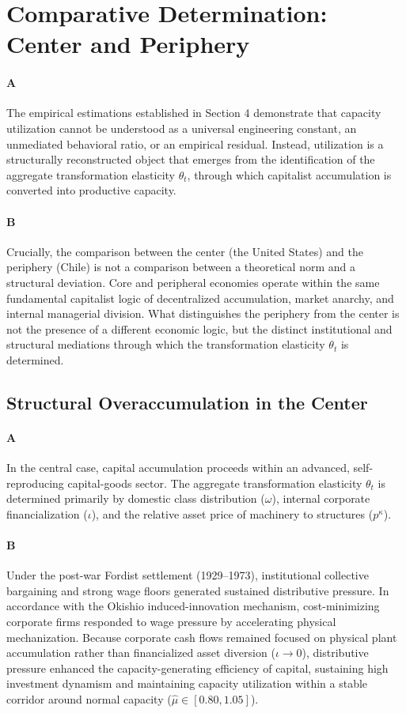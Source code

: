 \section{Comparative Determination: Center and Periphery}

\paragraph{A}
The empirical estimations established in Section 4 demonstrate that capacity utilization cannot be understood as a universal engineering constant, an unmediated behavioral ratio, or an empirical residual. Instead, utilization is a structurally reconstructed object that emerges from the identification of the aggregate transformation elasticity $\theta_t$, through which capitalist accumulation is converted into productive capacity.

\paragraph{B}
Crucially, the comparison between the center (the United States) and the periphery (Chile) is not a comparison between a theoretical norm and a structural deviation. Core and peripheral economies operate within the same fundamental capitalist logic of decentralized accumulation, market anarchy, and internal managerial division. What distinguishes the periphery from the center is not the presence of a different economic logic, but the distinct institutional and structural mediations through which the transformation elasticity $\theta_t$ is determined.

\subsection{Structural Overaccumulation in the Center}

\paragraph{A}
In the central case, capital accumulation proceeds within an advanced, self-reproducing capital-goods sector. The aggregate transformation elasticity $\theta_t$ is determined primarily by domestic class distribution ($\omega$), internal corporate financialization ($\iota$), and the relative asset price of machinery to structures ($p^\kappa$).

\paragraph{B}
Under the post-war Fordist settlement (1929–1973), institutional collective bargaining and strong wage floors generated sustained distributive pressure. In accordance with the Okishio induced-innovation mechanism, cost-minimizing corporate firms responded to wage pressure by accelerating physical mechanization. Because corporate cash flows remained focused on physical plant accumulation rather than financialized asset diversion ($\iota \to 0$), distributive pressure enhanced the capacity-generating efficiency of capital, sustaining high investment dynamism and maintaining capacity utilization within a stable corridor around normal capacity ($\hat{\mu} \in [0.80, 1.05]$).

